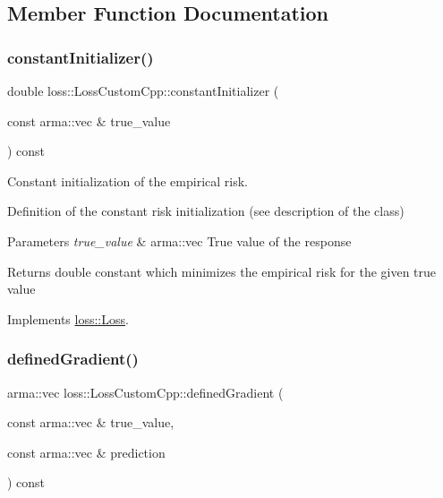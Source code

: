 \subsection{Member Function Documentation}
\mbox{\label{classloss_1_1_loss_custom_cpp_af6d7652231c313abe11009e44b51d0b1}} 
\subsubsection{\texorpdfstring{constant\+Initializer()}{constantInitializer()}}
{\footnotesize\ttfamily double loss\+::\+Loss\+Custom\+Cpp\+::constant\+Initializer (\begin{DoxyParamCaption}\item[{const arma\+::vec \&}]{true\+\_\+value }\end{DoxyParamCaption}) const\hspace{0.3cm}{\ttfamily [virtual]}}



Constant initialization of the empirical risk. 

Definition of the constant risk initialization (see description of the class)


\begin{DoxyParams}{Parameters}
{\em true\+\_\+value} & {\ttfamily arma\+::vec} True value of the response\\
\hline
\end{DoxyParams}
\begin{DoxyReturn}{Returns}
{\ttfamily double} constant which minimizes the empirical risk for the given true value 
\end{DoxyReturn}


Implements \mbox{\hyperlink{classloss_1_1_loss_a65fe7dcd9370e6a549b8d1cc95fc8798}{loss\+::\+Loss}}.

\mbox{\label{classloss_1_1_loss_custom_cpp_a8db4924e9a9866c00adf4a8cfd3ec38a}} 
\subsubsection{\texorpdfstring{defined\+Gradient()}{definedGradient()}}
{\footnotesize\ttfamily arma\+::vec loss\+::\+Loss\+Custom\+Cpp\+::defined\+Gradient (\begin{DoxyParamCaption}\item[{const arma\+::vec \&}]{true\+\_\+value,  }\item[{const arma\+::vec \&}]{prediction }\end{DoxyParamCaption}) const\hspace{0.3cm}{\ttfamily [virtual]}}



